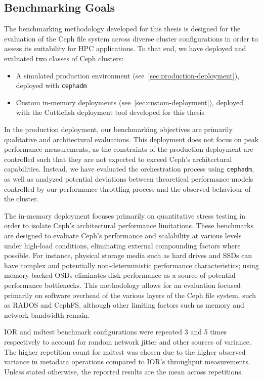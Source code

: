 \subsection{Benchmarking Goals}

The benchmarking methodology developed for this thesis is designed for the evaluation of the Ceph file system across diverse cluster configurations in order to assess its suitability for \ac{HPC} applications. To that end, we have deployed and evaluated two classes of Ceph clusters:

\begin{itemize}
    \item A simulated production environment (see~\cref{sec:production-deployment}), deployed with \texttt{cephadm}
    \item Custom in-memory deployments (see~\cref{sec:custom-deployment}), deployed with the Cuttlefish deployment tool developed for this thesis
\end{itemize}

In the production deployment, our benchmarking objectives are primarily qualitative and architectural evaluations. This deployment does not focus on peak performance measurements, as the constraints of the production deployment are controlled such that they are not expected to exceed Ceph's architectural capabilities. Instead, we have evaluated the orchestration process using \texttt{cephadm}, as well as analyzed potential deviations between theoretical performance models controlled by our performance throttling process and the observed behaviour of the cluster.

The in-memory deployment focuses primarily on quantitative stress testing in order to isolate Ceph's architectural performance limitations. These benchmarks are designed to evaluate Ceph's performance and scalability at various levels under high-load conditions, eliminating external compounding factors where possible. For instance, physical storage media such as hard drives and \acp{SSD} can have complex and potentially non-deterministic performance characteristics; using memory-backed \acp{OSD} eliminates disk performance as a source of potential performance bottlenecks. This methodology allows for an evaluation focused primarily on software overhead of the various layers of the Ceph file system, such as \ac{RADOS} and \ac{CephFS}, although other limiting factors such as memory and network bandwidth remain. 

\ac{IOR} and mdtest benchmark configurations were repeated 3 and 5 times respectively to account for random network jitter and other sources of variance. The higher repetition count for mdtest was chosen due to the higher observed variance in metadata operations compared to \ac{IOR}'s throughput measurements. Unless stated otherwise, the reported results are the mean across repetitions.

